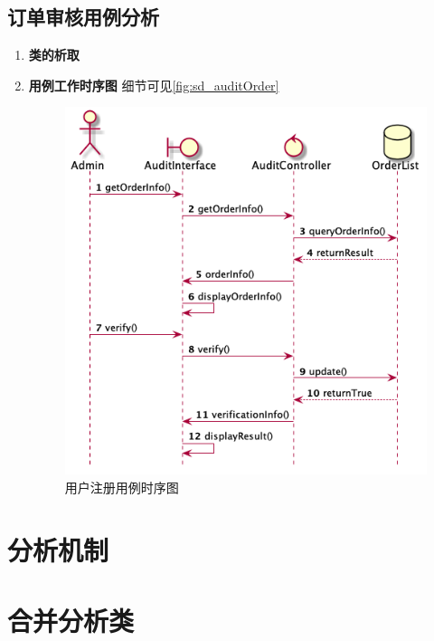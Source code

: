 	\subsection{订单审核用例分析} %
	\label{sub:订单审核用例分析}
	\begin{enumerate}
		\item \textbf{类的析取}

		\item \textbf{用例工作时序图}
		细节可见\autoref{fig:sd_auditOrder}

		\begin{figure}[htp]
		    \centering
		    \includegraphics[width=12cm]{figure/sequenceDiagram/sd_audit_order.png}
		    \caption{用户注册用例时序图}
		    \label{fig:sd_auditOrder}
		\end{figure}
	\end{enumerate}
	

\section{分析机制}

\section{合并分析类}